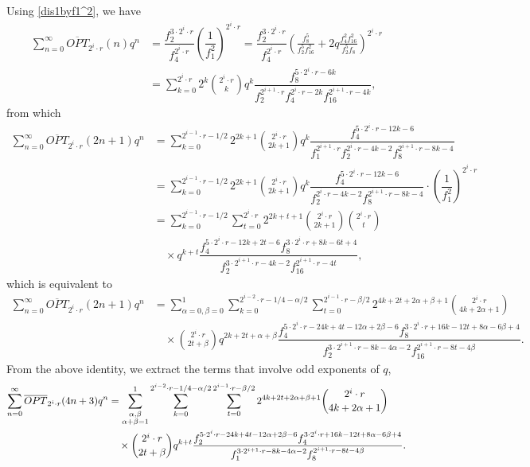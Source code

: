 \documentclass[12pt,reqno]{amsart}
\numberwithin{equation}{section}
\begin{document}
Using \eqref{dis1byf1^2}, we have
\begin{align*}
\sum_{n=0}^\infty \overline{OPT}_{2^i\cdot r}(n)q^n&=\dfrac{f_2^{3\cdot 2^i\cdot r}}{f_4^{2^i\cdot r}}\left(\dfrac{1}{f_1^2}\right)^{2^i\cdot r}=\dfrac{f_2^{3\cdot 2^i\cdot r}}{f_4^{2^i\cdot r}}\left(\frac{f_8^5}{f_2^5 f_{16}^2}+2q\frac{f_4^2 f_{16}^2}{f_2^5 f_8}\right)^{2^i\cdot r}\\
&=\sum_{k=0}^{2^i\cdot r}2^k\binom{2^i\cdot r}{k}q^k\dfrac{f_8^{5\cdot 2^i\cdot r-6 k}}{f_2^{2^{i+1}\cdot r}f_4^{2^i\cdot r-2k}f_{16}^{2^{i+1}\cdot r-4k}},
\end{align*}
from which
\begin{align*}
\sum_{n=0}^\infty \overline{OPT}_{2^i\cdot r}(2n+1)q^n
&=\sum_{k=0}^{2^{i-1}\cdot r-1/2}2^{2k+1}\binom{2^i\cdot r}{2k+1}q^k\dfrac{f_4^{5\cdot 2^i\cdot r-12k-6}}{f_1^{2^{i+1}\cdot r}f_2^{2^i\cdot r-4k-2}f_{8}^{2^{i+1}\cdot r-8k-4}}\\
&=\sum_{k=0}^{2^{i-1}\cdot r-1/2}2^{2k+1}\binom{2^i\cdot r}{2k+1}q^k\dfrac{f_4^{5\cdot 2^i\cdot r-12k-6}}{f_2^{2^i\cdot r-4k-2}f_{8}^{2^{i+1}\cdot r-8k-4}}\cdot \left(\dfrac{1}{f_1^2}\right)^{2^{i}\cdot r}\\
&=\sum_{k=0}^{2^{i-1}\cdot r-1/2}\sum_{t=0}^{2^{i}\cdot r}2^{2k+t+1}\binom{2^i\cdot r}{2k+1}\binom{2^i\cdot r}{t}\\ &\quad \times q^{k+t}\dfrac{f_4^{5\cdot 2^i\cdot r-12k+2t-6} f_8^{3\cdot 2^i\cdot r+8k-6t+4}}{f_2^{3\cdot 2^{i+1}\cdot r-4k-2}f_{16}^{2^{i+1}\cdot r-4t}},
\end{align*}
which is equivalent to
\begin{align*}
\sum_{n=0}^\infty \overline{OPT}_{2^i\cdot r}(2n+1)q^n
&=\sum_{\alpha=0,\beta=0}^1\sum_{k=0}^{2^{i-2}\cdot r-1/4-\alpha/2}\sum_{t=0}^{2^{i-1}\cdot r-\beta/2}2^{4k+2t+2\alpha+\beta+1}\binom{2^i\cdot r}{4k+2\alpha+1}\\
&\quad\times\binom{2^i\cdot r}{2t+\beta}q^{2k+2t+\alpha+\beta}\dfrac{f_4^{5\cdot 2^i\cdot r-24k+4t-12\alpha+2\beta-6} f_8^{3\cdot 2^i\cdot r+16k-12t+8\alpha-6\beta+4}}{f_2^{3\cdot 2^{i+1}\cdot r-8k-4\alpha-2}f_{16}^{2^{i+1}\cdot r-8t-4\beta}}.
\end{align*}
From the above identity, we extract the terms that involve odd exponents of $q$, 
\begin{align}
\sum_{n=0}^\infty \overline{OPT}_{2^i\cdot r}(4n+3)q^n
&=\sum_{\substack{\alpha,\beta\\\alpha+\beta=1}}^1\sum_{k=0}^{2^{i-2}\cdot r-1/4-\alpha/2}\sum_{t=0}^{2^{i-1}\cdot r-\beta/2}2^{4k+2t+2\alpha+\beta+1}\binom{2^i\cdot r}{4k+2\alpha+1}\notag\\
&\quad\times\binom{2^i\cdot r}{2t+\beta}q^{k+t}\dfrac{f_2^{5\cdot 2^i\cdot r-24k+4t-12\alpha+2\beta-6} f_4^{3\cdot 2^i\cdot r+16k-12t+8\alpha-6\beta+4}}{f_1^{3\cdot 2^{i+1}\cdot r-8k-4\alpha-2}f_{8}^{2^{i+1}\cdot r-8t-4\beta}}.\label{Correct 1}
\end{align}
\end{document}
